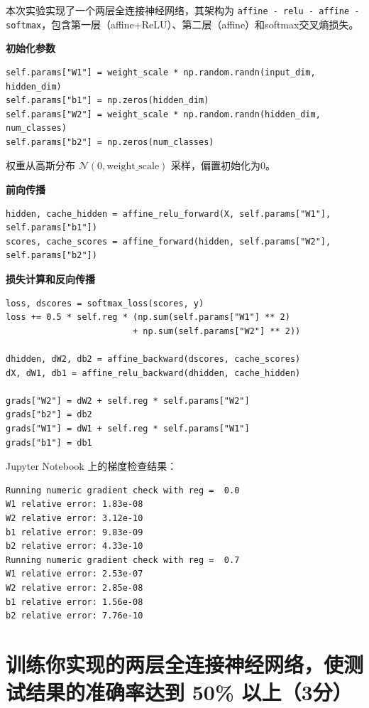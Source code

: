 本次实验实现了一个两层全连接神经网络，其架构为 \texttt{affine - relu - affine - softmax}，包含第一层（affine+ReLU）、第二层（affine）和softmax交叉熵损失。

\textbf{初始化参数}

\begin{lstlisting}[style=cleanpython]
self.params["W1"] = weight_scale * np.random.randn(input_dim, hidden_dim)
self.params["b1"] = np.zeros(hidden_dim)
self.params["W2"] = weight_scale * np.random.randn(hidden_dim, num_classes)
self.params["b2"] = np.zeros(num_classes)
\end{lstlisting}

权重从高斯分布 $\mathcal{N}(0, \text{weight\_scale})$ 采样，偏置初始化为0。

\textbf{前向传播}

\begin{lstlisting}[style=cleanpython]
hidden, cache_hidden = affine_relu_forward(X, self.params["W1"], self.params["b1"])
scores, cache_scores = affine_forward(hidden, self.params["W2"], self.params["b2"])
\end{lstlisting}

\textbf{损失计算和反向传播}

\begin{lstlisting}[style=cleanpython]
loss, dscores = softmax_loss(scores, y)
loss += 0.5 * self.reg * (np.sum(self.params["W1"] ** 2)
                         + np.sum(self.params["W2"] ** 2))

dhidden, dW2, db2 = affine_backward(dscores, cache_scores)
dX, dW1, db1 = affine_relu_backward(dhidden, cache_hidden)

grads["W2"] = dW2 + self.reg * self.params["W2"]
grads["b2"] = db2
grads["W1"] = dW1 + self.reg * self.params["W1"]
grads["b1"] = db1
\end{lstlisting}

Jupyter Notebook 上的梯度检查结果：

\begin{lstlisting}[style=cleanpython]
Running numeric gradient check with reg =  0.0
W1 relative error: 1.83e-08
W2 relative error: 3.12e-10
b1 relative error: 9.83e-09
b2 relative error: 4.33e-10
Running numeric gradient check with reg =  0.7
W1 relative error: 2.53e-07
W2 relative error: 2.85e-08
b1 relative error: 1.56e-08
b2 relative error: 7.76e-10
\end{lstlisting}

\section{训练你实现的两层全连接神经网络，使测试结果的准确率达到 50\% 以上（3分）}

